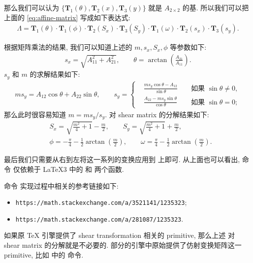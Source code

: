 \documentclass[
  hyper, 
  lang = cn, 
  class = l3doc,
  classOption={11pt},
  sect = {load=false},
]{../../zlatex/code/ztex}
\begin{document}
那么我们可以认为 $\{\mathbf{T}_1(\theta), \mathbf{T}_2(x), \mathbf{T}_3(y)\}$ 就是 $A_{2\times 2}$ 的基.
所以我们可以把上面的 \cref{eq:affine-matrix} 写成如下表达式:
\begin{align}\label{eq:affine-matrix-res}
  \Lambda = \mathbf{T}_1(\theta) \cdot \mathbf{T}_1(\phi)
  \cdot \mathbf{T}_2(S_x)\cdot \mathbf{T}_3(S_y)
  \cdot \mathbf{T}_1(\omega)\cdot \mathbf{T}_2(s_x)\cdot \mathbf{T}_3(s_y).
\end{align}

根据矩阵乘法的结果, 我们可以知道上述的 $m, s_x, S_x, \phi$ 等参数如下:
\begin{align*}
  s_x = \sqrt{A_{11}^2 + A_{21}^2},\qquad \theta = \arctan\left( \frac{A_{21}}{A_{11}} \right).
\end{align*}
$s_y$ 和 $m$ 的求解结果如下:
\begin{align*}
  ms_y = A_{12}\cos\theta + A_{22}\sin\theta,\qquad
  s_y = \left\{\begin{aligned}
    & \frac{m s_y\cos\theta - A_{12}}{\sin\theta} && \text{ 如果 } \sin\theta \neq 0, \\
    & \frac{A_{22} - m s_y\sin\theta}{\cos\theta} && \text{ 如果 } \sin\theta = 0;
  \end{aligned}\right. 
\end{align*}
那么此时很容易知道 $m = ms_y / s_y$. 对 shear matrix 的分解结果如下:
\begin{align*}
  & S_x = \sqrt{\frac{m^2}4+1} - \frac{m}2, \qquad
    S_y = \sqrt{\frac{m^2}4+1} + \frac{m}2, \\
  & \phi = -\frac{\pi}{4} - \frac{1}{2}\arctan(\frac{m}2), \qquad
    \omega = \frac{\pi}{4} - \frac{1}{2}\arctan(\frac{m}2).
\end{align*}

最后我们只需要从右到左将这一系列的变换应用到  上即可. 从上面也可以看出, 命令  
仅依赖于 \LaTeX3 中的  和  两个函数. 


\clearpage
命令  实现过程中相关的参考链接如下:
\begin{itemize}
  \item \texttt{https://math.stackexchange.com/a/3521141/1235323};
  \item \texttt{https://math.stackexchange.com/a/281087/1235323}.
\end{itemize}

\begin{leftbar}%
\noindent 如果原 \TeX{} 引擎提供了 shear transformation 相关的 primitive, 那么上述
对 shear matrix 的分解就是不必要的. 部分的引擎中原始提供了仿射变换矩阵这一 primitive, 
比如  中的 \cmd{\pdfsetmatrix} 命令.
\end{leftbar}
\end{document}
